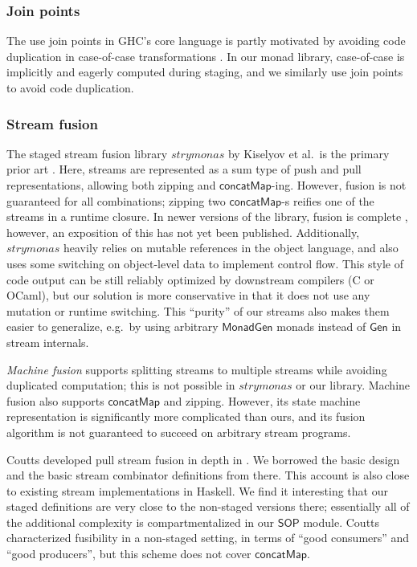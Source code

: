 \documentclass[acmsmall,screen]{acmart}
\newcommand{\msf}[1]{{\mathsf{#1}}}
\newcommand{\SOP}{\msf{SOP}}
\newcommand{\concatMap}{\msf{concatMap}}
\theoremstyle{remark}
\newcommand{\Gen}{\msf{Gen}}
\newcommand{\MonadGen}{\msf{MonadGen}}
\begin{document}
\subsubsection*{Join points}
The use join points in GHC's core language is partly motivated by avoiding code
duplication in case-of-case transformations
\cite{DBLP:conf/pldi/MaurerDAJ17}. In our monad library, case-of-case is
implicitly and eagerly computed during staging, and we similarly use join points
to avoid code duplication.

\subsubsection*{Stream fusion}
The staged stream fusion library $\mathit{strymonas}$ by Kiselyov et al.\ is the
primary prior art \cite{DBLP:conf/popl/KiselyovBPS17}. Here, streams are
represented as a sum type of push and pull representations, allowing both
zipping and $\concatMap$-ing. However, fusion is not guaranteed for all
combinations; zipping two $\concatMap$-s reifies one of the streams in a runtime
closure. In newer versions of the library, fusion is complete
\cite{DBLP:conf/pepm/0001K24}, however, an exposition of this has not yet been
published. Additionally, $\mathit{strymonas}$ heavily relies on mutable
references in the object language, and also uses some switching on object-level
data to implement control flow. This style of code output can be still reliably
optimized by downstream compilers (C or OCaml), but our solution is more
conservative in that it does not use any mutation or runtime switching.
This ``purity'' of our streams also makes them easier to generalize, e.g.\
by using arbitrary $\MonadGen$ monads instead of $\Gen$ in stream internals.

\emph{Machine fusion} \cite{DBLP:conf/ppdp/RobinsonL17} supports splitting
streams to multiple streams while avoiding duplicated computation; this is not
possible in $\mathit{strymonas}$ or our library. Machine fusion also supports
$\concatMap$ and zipping. However, its state machine representation is
significantly more complicated than ours, and its fusion algorithm is not
guaranteed to succeed on arbitrary stream programs.

Coutts developed pull stream fusion in depth in
\cite{DBLP:phd/ethos/Coutts11}. We borrowed the basic design and the basic
stream combinator definitions from there. This account is also close to existing
stream implementations in Haskell. We find it interesting that our staged
definitions are very close to the non-staged versions there; essentially all of
the additional complexity is compartmentalized in our $\SOP$ module.  Coutts
characterized fusibility in a non-staged setting, in terms of ``good consumers''
and ``good producers'', but this scheme does not cover $\concatMap$.
\end{document}
